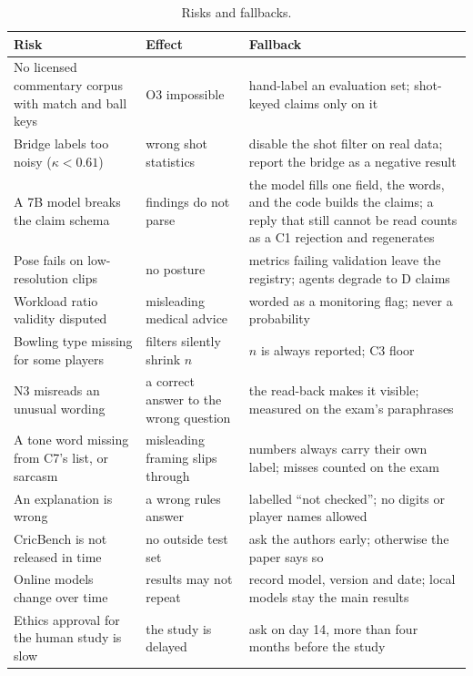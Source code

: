 \documentclass[11pt,a4paper]{article}
\begin{document}
\begin{table}[H]
\centering
\footnotesize
\renewcommand{\arraystretch}{1.2}
\begin{tabular}{@{}>{\raggedright\arraybackslash}p{4.8cm}
                  >{\raggedright\arraybackslash}p{4.0cm}
                  >{\raggedright\arraybackslash}p{6.4cm}@{}}
\toprule
\textbf{Risk} & \textbf{Effect} & \textbf{Fallback} \\
\midrule
No licensed commentary corpus with match and ball keys & O3 impossible & hand-label an evaluation set; shot-keyed claims only on it \\
Bridge labels too noisy ($\kappa < 0.61$) & wrong shot statistics & disable the shot filter on real data; report the bridge as a negative result \\
A 7B model breaks the claim schema & findings do not parse & the model fills one field, the words, and the code builds the claims; a reply that still cannot be read counts as a C1 rejection and regenerates \\
Pose fails on low-resolution clips & no posture & metrics failing validation leave the registry; agents degrade to D claims \\
Workload ratio validity disputed & misleading medical advice & worded as a monitoring flag; never a probability \\
Bowling type missing for some players & filters silently shrink $n$ & $n$ is always reported; C3 floor \\
N3 misreads an unusual wording & a correct answer to the wrong question & the read-back makes it visible; measured on the exam's paraphrases \\
A tone word missing from C7's list, or sarcasm & misleading framing slips through & numbers always carry their own label; misses counted on the exam \\
An explanation is wrong & a wrong rules answer & labelled ``not checked''; no digits or player names allowed \\
CricBench is not released in time & no outside test set & ask the authors early; otherwise the paper says so \\
Online models change over time & results may not repeat & record model, version and date; local models stay the main results \\
Ethics approval for the human study is slow & the study is delayed & ask on day 14, more than four months before the study \\
\bottomrule
\end{tabular}
\caption{Risks and fallbacks.}
\label{tab:risks}
\end{table}
\end{document}
